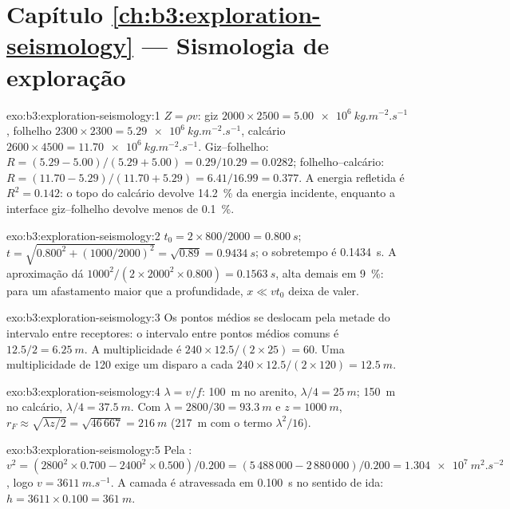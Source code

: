 \section*{Capítulo \ref{ch:b3:exploration-seismology} --- Sismologia de exploração}

\begin{solution}{exo:b3:exploration-seismology:1}
$Z = \rho v$: giz $2000\times2500 = \qty{5.00e6}{kg.m^{-2}.s^{-1}}$, folhelho
$2300\times2300 = \qty{5.29e6}{kg.m^{-2}.s^{-1}}$, calcário $2600\times4500 =
\qty{11.70e6}{kg.m^{-2}.s^{-1}}$. Giz--folhelho: $R = (5.29 - 5.00)/(5.29 + 5.00)
= 0.29/10.29 = 0.0282$; folhelho--calcário: $R = (11.70 - 5.29)/(11.70 + 5.29) =
6.41/16.99 = 0.377$. A energia refletida é $R^2 = 0.142$: o topo do
calcário devolve \qty{14.2}{\percent} da energia incidente, enquanto a
interface giz--folhelho devolve menos de \qty{0.1}{\percent}.
\end{solution}

\begin{solution}{exo:b3:exploration-seismology:2}
$t_0 = 2\times800/2000 = \qty{0.800}{s}$; $t = \sqrt{0.800^2 + (1000/2000)^2} =
\sqrt{0.89} = \qty{0.9434}{s}$; o sobretempo é \qty{0.1434}{s}.
A aproximação dá $1000^2/(2\times2000^2\times0.800) = \qty{0.1563}{s}$, alta
demais em \qty{9}{\percent}: para um afastamento maior que a profundidade, $x \ll vt_0$
deixa de valer.
\end{solution}

\begin{solution}{exo:b3:exploration-seismology:3}
Os pontos médios se deslocam pela metade do intervalo entre receptores: o intervalo entre pontos médios comuns é
$12.5/2 = \qty{6.25}{m}$. A multiplicidade é $240\times12.5/(2\times25) = 60$. Uma multiplicidade de
120 exige um disparo a cada $240\times12.5/(2\times120) = \qty{12.5}{m}$.
\end{solution}

\begin{solution}{exo:b3:exploration-seismology:4}
$\lambda = v/f$: \qty{100}{m} no arenito, $\lambda/4 = \qty{25}{m}$;
\qty{150}{m} no calcário, $\lambda/4 = \qty{37.5}{m}$. Com
$\lambda = 2800/30 = \qty{93.3}{m}$ e $z = \qty{1000}{m}$,
$r_F \approx \sqrt{\lambda z/2} = \sqrt{46\,667} = \qty{216}{m}$ (\qty{217}{m}
com o termo $\lambda^2/16$).
\end{solution}

\begin{solution}{exo:b3:exploration-seismology:5}
Pela : $v^2 = (2800^2\times0.700 - 2400^2\times0.500)/0.200 = (5\,488\,000 -
2\,880\,000)/0.200 = \qty{1.304e7}{m^2.s^{-2}}$, logo $v = \qty{3611}{m.s^{-1}}$.
A camada é atravessada em \qty{0.100}{s} no sentido de ida: $h = 3611\times0.100 =
\qty{361}{m}$.
\end{solution}

